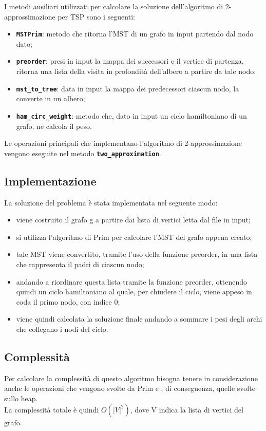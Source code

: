 	I metodi ausiliari utilizzati per calcolare la soluzione dell'algoritmo di 2-approssimazione per TSP sono i seguenti:
	\begin{itemize}
		\item \texttt{\textbf{MSTPrim}}: metodo che ritorna l'MST di un grafo in input partendo dal nodo dato; 
		\item \texttt{\textbf{preorder}}: presi in input la mappa dei successori e il vertice di partenza, ritorna una lista della visita in profondità dell'albero a partire da tale nodo; 
		\item \texttt{\textbf{mst\_to\_tree}}: data in input la mappa dei predecessori ciascun nodo, la converte in un albero; 
		\item \texttt{\textbf{ham\_circ\_weight}}: metodo che, dato in input un ciclo hamiltoniano di un grafo, ne calcola il peso.
	\end{itemize}
	Le operazioni principali che implementano l'algoritmo di 2-approssimazione vengono eseguite nel metodo \texttt{\textbf{two\_approximation}}.

\subsection{Implementazione}
	
	La soluzione del problema è stata implementata nel seguente modo:
	\begin{itemize}
		\item viene costruito il grafo g a partire dai lista di vertici letta dal file in input;
		\item si utilizza l'algoritmo di Prim per calcolare l'MST del grafo appena creato;
		\item tale MST viene convertito, tramite l'uso della funzione preorder, in una lista che rappresenta il padri di ciascun nodo;
		\item andando a riordinare questa lista tramite la funzione preorder, ottenendo quindi un ciclo hamiltoniano al quale, per chiudere il ciclo, viene appeso in coda il primo nodo, con indice 0;
		\item viene quindi calcolata la soluzione finale andando a sommare i pesi degli archi che collegano i nodi del ciclo.
	\end{itemize}
		
\subsection{Complessità}

	Per calcolare la complessità di questo algoritmo bisogna tenere in considerazione anche le operazioni che vengono svolte da Prim e , di conseguenza, quelle svolte sullo heap.\\
	La complessità totale è quindi $O(|V|^2)$, dove V indica la lista di vertici del grafo.

\pagebreak